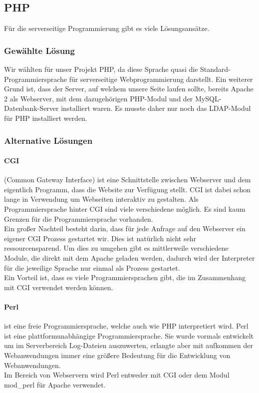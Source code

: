 \subsection{PHP}
Für die serverseitige Programmierung gibt es viele Lösungsansätze. 
\subsubsection{Gewählte Lösung}
Wir wählten für unser Projekt PHP, da diese Sprache quasi die Standard-Programmiersprache für serverseitige Webprogrammierung darstellt. Ein weiterer Grund ist, dass der Server, auf welchem unsere Seite laufen sollte, bereits Apache 2 als Webserver, mit dem dazugehörigen PHP-Modul und der MySQL-Datenbank-Server installiert waren. Es musste daher nur noch das LDAP-Modul für PHP installiert werden.
\subsubsection{Alternative Lösungen}
\paragraph{CGI} (Common Gateway Interface) ist eine Schnittstelle zwischen Webserver und dem eigentlich Programm, dass die Website zur Verfügung stellt. CGI ist dabei schon lange in Verwendung um Webseiten interaktiv zu gestalten. Als Programmiersprache hinter CGI sind viele verschiedene möglich. Es sind kaum Grenzen für die Programmiersprache vorhanden.\\
Ein großer Nachteil besteht darin, dass für jede Anfrage auf den Webserver ein eigener CGI Prozess gestartet wir. Dies ist natürlich nicht sehr ressourcensparend. Um dies zu umgehen gibt es mittlerweile verschiedene Module, die direkt mit dem Apache geladen werden, dadurch wird der Interpreter für die jeweilige Sprache nur einmal als Prozess gestartet.\\
Ein Vorteil ist, dass es viele Programmiersprachen gibt, die im Zusammenhang mit CGI verwendet werden können. 
\paragraph{Perl}
 ist eine freie Programmiersprache, welche auch wie PHP interpretiert wird. Perl ist eine plattformunabhängige Programmiersprache. Sie wurde vormals entwickelt um im Serverbereich Log-Dateien auszuwerten, erlangte aber mit aufkommen der Webanwendungen immer eine größere Bedeutung für die Entwicklung von Webanwendungen.\\
Im Bereich von Webservern wird Perl entweder mit CGI oder dem Modul mod\_perl für Apache verwendet.\\
